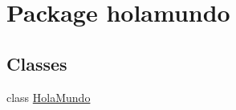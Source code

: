 \hypertarget{namespaceholamundo}{}\section{Package holamundo}
\label{namespaceholamundo}
\subsection*{Classes}
\begin{DoxyCompactItemize}
\item 
class \mbox{\hyperlink{classholamundo_1_1_hola_mundo}{Hola\+Mundo}}
\end{DoxyCompactItemize}
